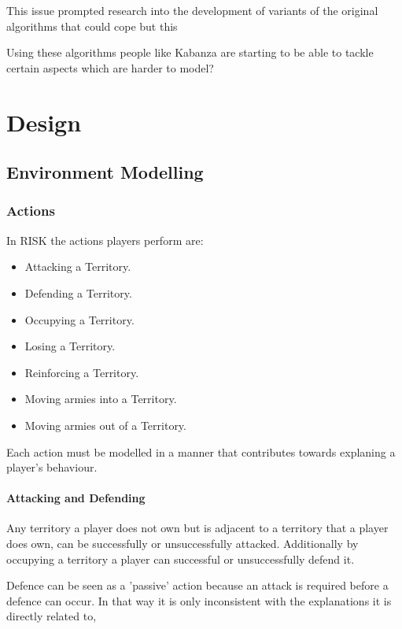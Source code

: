 \documentclass[parskip]{cs4rep}
\begin{document}
This issue prompted research into the development of variants of the original algorithms that could cope but this 

Using these algorithms people like Kabanza are starting to be able to tackle certain aspects which are harder to model?

\chapter{Design}

\section{Environment Modelling}

\subsection{Actions}

In RISK the actions players perform are:

\begin{itemize}
\item
Attacking a Territory.
\item
Defending a Territory.
\item
Occupying a Territory.
\item
Losing a Territory.
\item
Reinforcing a Territory.
\item
Moving armies into a Territory.
\item
Moving armies out of a Territory.
\end{itemize}

Each action must be modelled in a manner that contributes towards explaning a player's behaviour.

\subsubsection{Attacking and Defending}

Any territory a player does not own but is adjacent to a territory that a player does own, can be successfully or unsuccessfully attacked. Additionally by occupying a territory a player can successful or unsuccessfully defend it.

Defence can be seen as a 'passive' action because an attack is required before a defence can occur. In that way it is only inconsistent with the explanations it is directly related to, 
\end{document}
